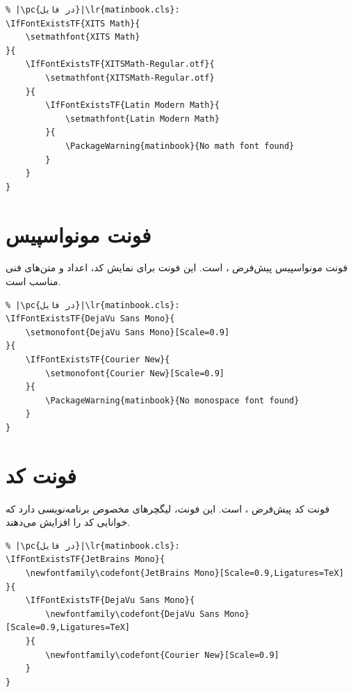 \begin{latin}
\begin{verbatim}
% |\pc{در فایل}|\lr{matinbook.cls}:
\IfFontExistsTF{XITS Math}{
    \setmathfont{XITS Math}
}{
    \IfFontExistsTF{XITSMath-Regular.otf}{
        \setmathfont{XITSMath-Regular.otf}
    }{
        \IfFontExistsTF{Latin Modern Math}{
            \setmathfont{Latin Modern Math}
        }{
            \PackageWarning{matinbook}{No math font found}
        }
    }
}
\end{verbatim}
\end{latin}


\section{فونت مونواسپیس}
\label{sec:fonts-monospace}

فونت مونواسپیس پیش‌فرض ،
 است. این فونت برای
نمایش کد، اعداد و متن‌های فنی مناسب است.

\begin{latin}
\begin{verbatim}
% |\pc{در فایل}|\lr{matinbook.cls}:
\IfFontExistsTF{DejaVu Sans Mono}{
    \setmonofont{DejaVu Sans Mono}[Scale=0.9]
}{
    \IfFontExistsTF{Courier New}{
        \setmonofont{Courier New}[Scale=0.9]
    }{
        \PackageWarning{matinbook}{No monospace font found}
    }
}
\end{verbatim}
\end{latin}


\section{فونت کد}
\label{sec:fonts-code}

فونت کد پیش‌فرض ،  است. این فونت، لیگچرهای مخصوص
برنامه‌نویسی دارد که خوانایی کد را افزایش
می‌دهند.

\begin{latin}
\begin{verbatim}
% |\pc{در فایل}|\lr{matinbook.cls}:
\IfFontExistsTF{JetBrains Mono}{
    \newfontfamily\codefont{JetBrains Mono}[Scale=0.9,Ligatures=TeX]
}{
    \IfFontExistsTF{DejaVu Sans Mono}{
        \newfontfamily\codefont{DejaVu Sans Mono}[Scale=0.9,Ligatures=TeX]
    }{
        \newfontfamily\codefont{Courier New}[Scale=0.9]
    }
}
\end{verbatim}
\end{latin}

